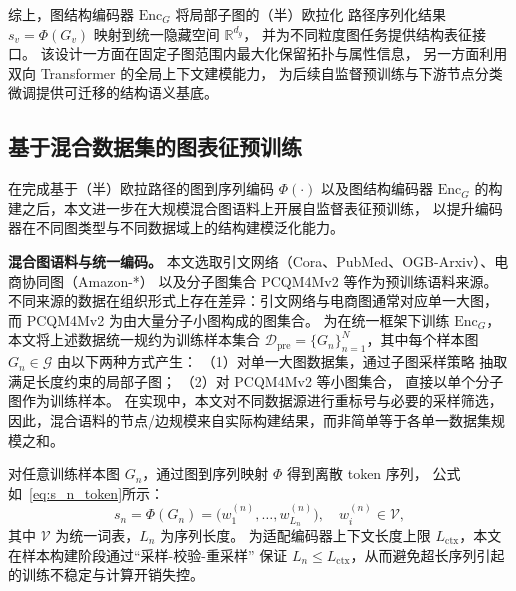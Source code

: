  综上，图结构编码器 $\mathrm{Enc}_G$ 将局部子图的（半）欧拉化 路径序列化结果
$s_v=\Phi(G_v)$ 映射到统一隐藏空间 $\mathbb{R}^{d_g}$，
并为不同粒度图任务提供结构表征接口。
该设计一方面在固定子图范围内最大化保留拓扑与属性信息，
另一方面利用双向 Transformer 的全局上下文建模能力，
为后续自监督预训练与下游节点分类微调提供可迁移的结构语义基底。

\subsection{基于混合数据集的图表征预训练}

在完成基于（半）欧拉路径的图到序列编码 $\Phi(\cdot)$ 以及图结构编码器
$\mathrm{Enc}_G$ 的构建之后，本文进一步在大规模混合图语料上开展自监督表征预训练，
以提升编码器在不同图类型与不同数据域上的结构建模泛化能力。

\textbf{混合图语料与统一编码。}
本文选取引文网络（Cora\cite{Hu2020OpenGB}、PubMed\cite{Sen2008CollectiveCI}、OGB-Arxiv\cite{Hu2020OpenGB}）、电商协同图（Amazon-*） \cite{Wan2018ItemRO}以及分子图集合
PCQM4Mv2\cite{Hu2021OGBLSCAL} 等作为预训练语料来源。
不同来源的数据在组织形式上存在差异：引文网络与电商图通常对应单一大图，
而 PCQM4Mv2 \cite{Hu2021OGBLSCAL}为由大量分子小图构成的图集合。
为在统一框架下训练 $\mathrm{Enc}_G$，本文将上述数据统一规约为训练样本集合
$\mathcal{D}_{\mathrm{pre}}=\{G_n\}_{n=1}^{N}$，其中每个样本图 $G_n\in\mathcal{G}$ 由以下两种方式产生：
（1）对单一大图数据集，通过子图采样策略
抽取满足长度约束的局部子图；
（2）对 PCQM4Mv2 \cite{Hu2021OGBLSCAL}等小图集合，
直接以单个分子图作为训练样本。
在实现中，本文对不同数据源进行重标号与必要的采样筛选，
因此，混合语料的节点/边规模来自实际构建结果，而非简单等于各单一数据集规模之和。

对任意训练样本图 $G_n$，通过图到序列映射 $\Phi$ 得到离散 token 序列，
公式如~\ref{eq:s_n_token}所示：
\begin{equation}
s_n = \Phi(G_n) = \big(w^{(n)}_1,\dots,w^{(n)}_{L_n}\big), \quad w^{(n)}_i\in\mathcal{V},
\label{eq:s_n_token}
\end{equation}
其中 $\mathcal{V}$ 为统一词表，$L_n$ 为序列长度。
为适配编码器上下文长度上限 $L_{\mathrm{ctx}}$，本文在样本构建阶段通过“采样-校验-重采样”
保证 $L_n\le L_{\mathrm{ctx}}$，从而避免超长序列引起的训练不稳定与计算开销失控。

